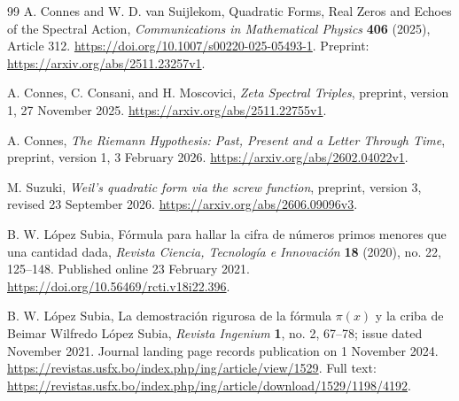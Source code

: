 \documentclass[11pt,letterpaper]{article}
\numberwithin{equation}{section}
\theoremstyle{definition}
\theoremstyle{remark}
\begin{document}
\begin{thebibliography}{99}
A. Connes and W. D. van Suijlekom,
Quadratic Forms, Real Zeros and Echoes of the Spectral Action,
\emph{Communications in Mathematical Physics} \textbf{406} (2025), Article 312.
\url{https://doi.org/10.1007/s00220-025-05493-1}.
Preprint: \url{https://arxiv.org/abs/2511.23257v1}.

A. Connes, C. Consani, and H. Moscovici,
\emph{Zeta Spectral Triples}, preprint, version 1, 27 November 2025.
\url{https://arxiv.org/abs/2511.22755v1}.

A. Connes,
\emph{The Riemann Hypothesis: Past, Present and a Letter Through Time},
preprint, version 1, 3 February 2026.
\url{https://arxiv.org/abs/2602.04022v1}.

M. Suzuki,
\emph{Weil's quadratic form via the screw function},
preprint, version 3, revised 23 September 2026.
\url{https://arxiv.org/abs/2606.09096v3}.

B. W. L\'opez Subia,
F\'ormula para hallar la cifra de n\'umeros primos menores que una cantidad dada,
\emph{Revista Ciencia, Tecnolog\'ia e Innovaci\'on} \textbf{18} (2020), no. 22, 125--148.
Published online 23 February 2021.
\url{https://doi.org/10.56469/rcti.v18i22.396}.

B. W. L\'opez Subia,
La demostraci\'on rigurosa de la f\'ormula $\pi(x)$ y la criba de Beimar Wilfredo L\'opez Subia,
\emph{Revista Ingenium} \textbf{1}, no. 2, 67--78; issue dated November 2021.
Journal landing page records publication on 1 November 2024.
\url{https://revistas.usfx.bo/index.php/ing/article/view/1529}.
Full text: \url{https://revistas.usfx.bo/index.php/ing/article/download/1529/1198/4192}.

\end{thebibliography}
\end{document}
